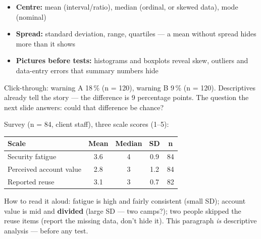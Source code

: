 \documentclass[11pt,a4paper,british,twoside=false,headings=small,chapterprefix=false,numbers=noenddot]{scrbook}
\newenvironment{block}[1]{\begin{tcolorbox}[scriptbox, title={#1}]}{\end{tcolorbox}}
\begin{document}
\begin{center}\small
\begin{itemize}\setlength{\itemsep}{0.45em}
    \item \textbf{Centre:} mean (interval/ratio), median (ordinal, or skewed
          data), mode (nominal)
    \item \textbf{Spread:} standard deviation, range, quartiles --- a mean
          without spread hides more than it shows
    \item \textbf{Pictures before tests:} histograms and boxplots reveal
          skew, outliers and data-entry errors that summary numbers hide
  \end{itemize}
  
  \begin{block}{Worked example --- the phishing experiment (session 6)}
    Click-through: warning A 18\,\% (n = 120), warning B 9\,\% (n = 120).
    Descriptives already tell the story --- the difference is 9 percentage
    points. The question the next slide answers: could that difference be
    chance?
  \end{block}
\end{center}

\begin{center}\small
\small
  Survey (n = 84, client staff), three scale scores (1--5):
  
  \renewcommand{\arraystretch}{1.3}
  \begin{tabular}{@{}p{4.6cm}cccc@{}}
    \toprule
    \textbf{Scale} & \textbf{Mean} & \textbf{Median} & \textbf{SD} & \textbf{n}\\
    \midrule
    Security fatigue & 3.6 & 4 & 0.9 & 84\\
    Perceived account value & 2.8 & 3 & 1.2 & 84\\
    Reported reuse & 3.1 & 3 & 0.7 & 82\\
    \bottomrule
  \end{tabular}
  

  How to read it aloud: fatigue is high and fairly consistent (small SD);
  account value is mid and \textbf{divided} (large SD --- two camps?);
  two people skipped the reuse items (report the missing data, don't hide
  it). This paragraph \emph{is} descriptive analysis --- before any test.
\end{center}
\end{document}
